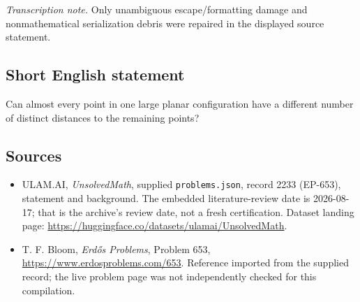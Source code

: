 \documentclass[11pt,a4paper]{article}
\begin{document}
{\small\emph{Transcription note.} Only unambiguous escape/formatting damage and nonmathematical serialization debris were repaired in the displayed source statement.}

\subsection{Short English statement}

Can almost every point in one large planar configuration have a different number of distinct distances to the remaining points?

\subsection{Sources}

{\small

\begin{itemize}

\item[\hypertarget{source:2233:1}{S1}] ULAM.AI, \emph{UnsolvedMath}, supplied \texttt{problems.json}, record 2233 (EP-653), statement and background. The embedded literature-review date is 2026-08-17; that is the archive’s review date, not a fresh certification. Dataset landing page: \url{https://huggingface.co/datasets/ulamai/UnsolvedMath}.

\item[\hypertarget{source:2233:2}{S2}] T. F. Bloom, \emph{Erdős Problems}, Problem 653, \url{https://www.erdosproblems.com/653}. Reference imported from the supplied record; the live problem page was not independently checked for this compilation.

\end{itemize}

}

\label{end:2233}
\end{document}

